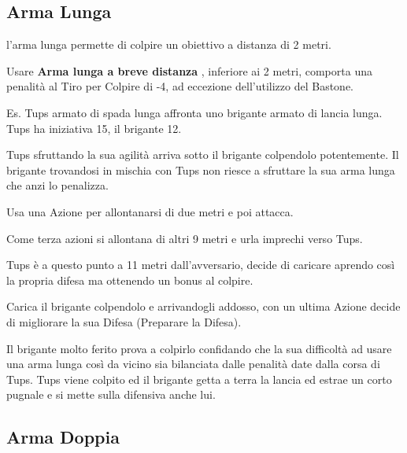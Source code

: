 \begin{multicols}{2}
%
\subsection{Arma Lunga} \label{armalunga}

l'arma lunga permette di colpire un obiettivo a distanza di 2 metri.

Usare \textbf{Arma lunga a breve distanza} \label{armalungabrevedistanza}, inferiore ai 2 metri, comporta una penalità al Tiro per Colpire di -4, ad eccezione dell'utilizzo del Bastone.

\begin{changemargin}{0.3cm}{0.3cm}\begin{tcolorbox}[title = Combattimento con Arma Lunga]
		Es. Tups armato di spada lunga affronta uno brigante armato di lancia lunga. Tups ha iniziativa 15, il brigante 12.

		Tups sfruttando la sua agilità arriva sotto il brigante colpendolo potentemente. Il brigante trovandosi in mischia con Tups non riesce a sfruttare la sua arma lunga che anzi lo penalizza.

		Usa una Azione per allontanarsi di due metri e poi attacca.

		Come terza azioni si allontana di altri 9 metri e urla imprechi verso Tups.

		Tups è a questo punto a 11 metri dall'avversario, decide di caricare aprendo così la propria difesa ma ottenendo un bonus al colpire.

		Carica il brigante colpendolo e arrivandogli addosso, con un ultima Azione decide di migliorare la sua Difesa (Preparare la Difesa).

		Il brigante molto ferito prova a colpirlo confidando che la sua difficoltà ad usare una arma lunga così da vicino sia bilanciata dalle penalità date dalla corsa di Tups. Tups viene colpito ed il brigante getta a terra la lancia ed estrae un corto pugnale e si mette sulla difensiva anche lui.

\end{tcolorbox}\end{changemargin}

\subsection{Arma Doppia} \label{armadippia}


\end{multicols}

